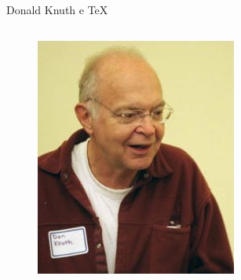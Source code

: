 \documentclass[hyperref={pdfpagelabels=false}]{beamer}
\begin{document}
\begin{frame}{Donald Knuth e \TeX{}}
    \begin{columns}[c]
        \begin{column}{0.5\textwidth}
            \begin{figure}
                \centering{}
                \includegraphics[width=\textwidth]{images/knuth}
            \end{figure}
        \end{column}
        \begin{column}{0.5\textwidth}
            \begin{figure}
                \centering{}

\end{figure}
\end{column}
\end{columns}
\end{frame}
\end{document}
